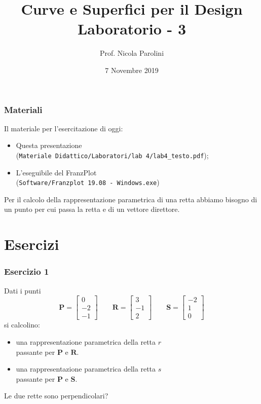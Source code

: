 \documentclass{beamer}
\title[Curve e Sup. - Lab 3]{Curve e Superfici per il Design \\ Laboratorio - 3}
\author[Prof. Parolini]{Prof. Nicola Parolini}
\date{7 Novembre 2019}
\newcommand{\frnzplt}{FranzPlot }
\begin{document}
\begin{frame}
\frametitle{Materiali}
Il materiale per l'esercitazione di oggi:
\begin{itemize}
\item Questa presentazione \\ (\texttt{Materiale Didattico/Laboratori/lab 4/lab4\_testo.pdf});
\item L'eseguibile del \frnzplt \\ (\texttt{Software/Franzplot 19.08 - Windows.exe})
\end{itemize}
\end{frame}

Per il calcolo della rappresentazione parametrica di una retta abbiamo bisogno di
un punto per cui passa la retta e di un vettore direttore.

\section{Esercizi}
\begin{frame}
\frametitle{Esercizio 1}
Dati i punti
$$
\mathbf{P}=\left[
\begin{array}{c}
0\\
-2\\
-1
\end{array}
\right]
\qquad
\mathbf{R}=\left[
\begin{array}{c}
3\\
-1\\
2
\end{array}
\right] \qquad
\mathbf{S}=\left[
\begin{array}{c}
-2\\
1\\
0
\end{array}
\right] 
$$
si calcolino:
    \begin{itemize}
    \item una rappresentazione parametrica della retta $r$ \\ passante per $\mathbf{P}$ e $\mathbf{R}$.
    \item una rappresentazione parametrica della retta $s$ \\ passante per $\mathbf{P}$ e $\mathbf{S}$.
    \end{itemize}
    
Le due rette sono perpendicolari?
\end{frame}
\end{document}
